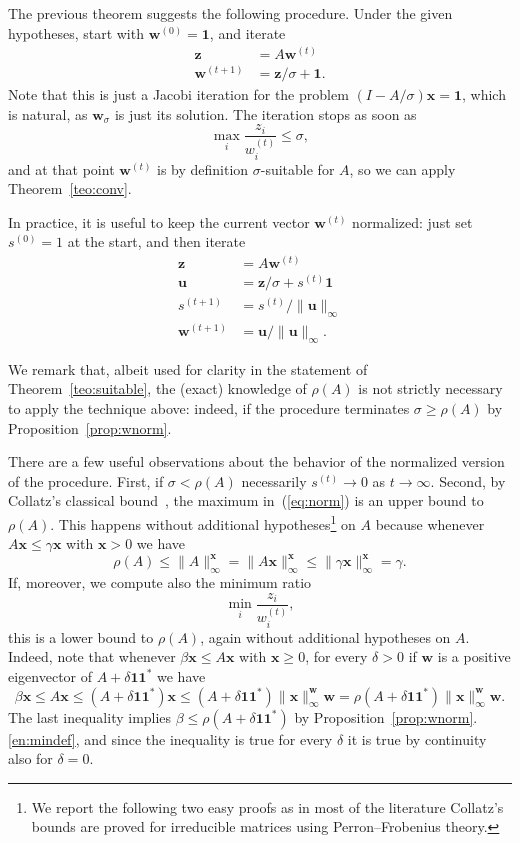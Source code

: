 \documentclass{article}
\newcommand{\w}{{\bm w}}
\newcommand{\x}{{\bm x}}
\newcommand{\1}{\mathbf 1}
\begin{document}
The previous theorem suggests the following procedure. Under the given
hypotheses, start with $\w^{(0)}=\1$, and iterate
\begin{align*}
\bm z&=A \w^{(t)}\\
\w^{(t+1)}&=\bm z/\sigma+\1.
\end{align*}
Note that this is just a Jacobi iteration for the problem $(I-A/\sigma)\bm
x=\1$, which is natural, as $\w_\sigma$ is just its solution.
The iteration stops as soon as
\begin{equation}
\label{eq:norm}
\max_i \frac{z_i}{w^{(t)}_i}\leq \sigma,
\end{equation}
and at that point $\w^{(t)}$ is by definition $\sigma$-suitable for $A$, 
so we can apply Theorem~\ref{teo:conv}. 

In practice, it is useful to keep the current vector
$\w^{(t)}$ normalized: just set $s^{(0)}=1$ at the start, and then iterate
\begin{align*}
\bm z&=A \w^{(t)}\\
\bm u&=\bm z/\sigma+s^{(t)}\1\\
s^{(t+1)} &= s^{(t)} / \|\bm u\|_\infty\\
\w^{(t+1)}&=\bm u / \|\bm u\|_\infty.
\end{align*}

We remark that, albeit used for clarity in the statement of Theorem~\ref{teo:suitable}, the (exact) knowledge of $\rho(A)$ is
not strictly necessary to apply the technique above: indeed, if the procedure terminates $\sigma\geq\rho(A)$ by
Proposition~\ref{prop:wnorm}.  

There are a few useful observations about the behavior of the normalized
version of the procedure. First, if $\sigma < \rho(A)$ necessarily $s^{(t)}\to 0$ as
$t\to \infty$. Second, by Collatz's classical bound~\cite{ColECZM},
the maximum in~(\ref{eq:norm}) is an upper bound to $\rho(A)$. This happens
without additional hypotheses\footnote{We report the following two easy proofs
as in most of the literature Collatz's bounds are proved for irreducible
matrices using Perron--Frobenius theory.} on $A$ because whenever $A\x\leq
\gamma\x$ with $\x>0$ we have
\[
\rho(A)\leq \|A\|^\x_\infty=\|A\x\|^\x_\infty\leq\|\gamma \x\|^\x_\infty=\gamma.
\]
If, moreover, we compute also the minimum ratio
\begin{equation}
\label{eq:min}
\min_i \frac{z_i}{w^{(t)}_i},
\end{equation}
this is a lower bound to $\rho(A)$, again without additional hypotheses on $A$.
Indeed, note that whenever $\beta\x\leq A\x$ with
$\x\geq0$, for every $\delta>0$ if $\w$ is a positive eigenvector of
$A+\delta\1\1^*$ we have
\[
\beta\x\leq A\x\leq (A+\delta\1\1^*)\x\leq
(A+\delta\1\1^*)\|\x\|^\w_\infty \w = \rho(A+\delta\1\1^*)\|\x\|^\w_\infty \w.
\]
The last inequality implies $\beta\leq\rho(A+\delta\1\1^*)$ by
Proposition~\ref{prop:wnorm}.\ref{en:mindef}, and since the inequality is
true for every $\delta$ it is true by continuity also for $\delta=0$.
\end{document}
